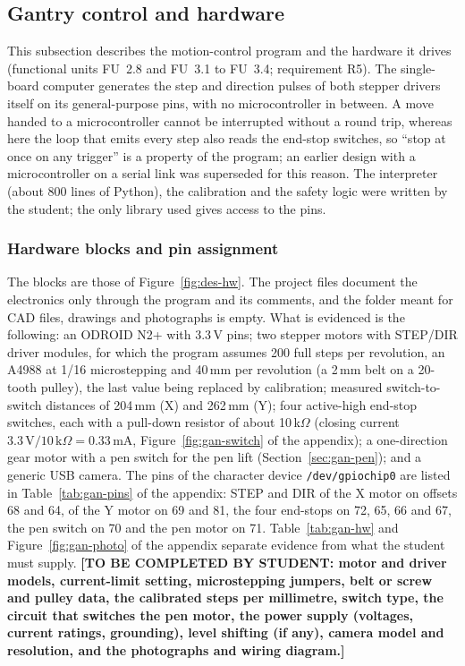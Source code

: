 \subsection{Gantry control and hardware}
\label{sec:gantry}

This subsection describes the motion-control program and the hardware it drives (functional units FU~2.8 and FU~3.1 to FU~3.4; requirement R5).
The single-board computer generates the step and direction pulses of both stepper drivers itself on its general-purpose pins, with no microcontroller in between.
A move handed to a microcontroller cannot be interrupted without a round trip, whereas here the loop that emits every step also reads the end-stop switches, so ``stop at once on any trigger'' is a property of the program; an earlier design with a microcontroller on a serial link was superseded for this reason.
The interpreter (about 800 lines of Python), the calibration and the safety logic were written by the student; the only library used gives access to the pins.

\subsubsection{Hardware blocks and pin assignment}

The blocks are those of Figure~\ref{fig:des-hw}.
The project files document the electronics only through the program and its comments, and the folder meant for CAD files, drawings and photographs is empty.
What is evidenced is the following: an ODROID N2+ with 3.3\,V pins; two stepper motors with STEP/DIR driver modules, for which the program assumes 200 full steps per revolution, an A4988 at 1/16 microstepping and 40\,mm per revolution (a 2\,mm belt on a 20-tooth pulley), the last value being replaced by calibration; measured switch-to-switch distances of 204\,mm (X) and 262\,mm (Y); four active-high end-stop switches, each with a pull-down resistor of about 10\,k$\Omega$ (closing current $3.3\,\mathrm{V}/10\,\mathrm{k}\Omega=0.33$\,mA, Figure~\ref{fig:gan-switch} of the appendix); a one-direction gear motor with a pen switch for the pen lift (Section~\ref{sec:gan-pen}); and a generic USB camera.
The pins of the character device \texttt{/dev/gpiochip0} are listed in Table~\ref{tab:gan-pins} of the appendix: STEP and DIR of the X motor on offsets 68 and 64, of the Y motor on 69 and 81, the four end-stops on 72, 65, 66 and 67, the pen switch on 70 and the pen motor on 71.
Table~\ref{tab:gan-hw} and Figure~\ref{fig:gan-photo} of the appendix separate evidence from what the student must supply.
\textbf{[TO BE COMPLETED BY STUDENT: motor and driver models, current-limit setting, microstepping jumpers, belt or screw and pulley data, the calibrated steps per millimetre, switch type, the circuit that switches the pen motor, the power supply (voltages, current ratings, grounding), level shifting (if any), camera model and resolution, and the photographs and wiring diagram.]}

